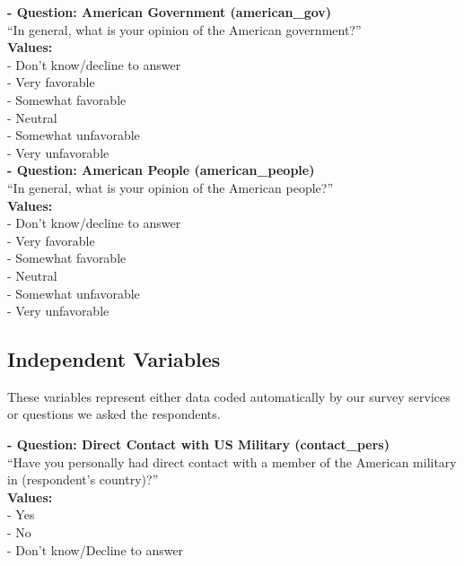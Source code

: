 \documentclass[12pt]{article}
\begin{document}
\noindent\textbf{  - Question: American Government (american\_gov)} \\
``In general, what is your opinion of the American government?''\\
\textbf{Values:}\\
 - Don’t know/decline to answer\\
 - Very favorable \\
 - Somewhat favorable\\
 - Neutral\\
 - Somewhat unfavorable\\
 - Very unfavorable\\


\noindent\textbf{  - Question: American People (american\_people)} \\
``In general, what is your opinion of the American people?''\\
\textbf{Values:}\\
 - Don’t know/decline to answer\\
 - Very favorable \\
 - Somewhat favorable\\
 - Neutral\\
 - Somewhat unfavorable\\
 - Very unfavorable\\




\subsection{Independent Variables}

These variables represent either data coded automatically by our survey services or questions we asked the respondents. 


\noindent\textbf{  - Question: Direct Contact with US Military  (contact\_pers)} \\
``Have you personally had direct contact with a member of the American military in (respondent's country)?''\\
\textbf{Values:}\\
 - Yes\\
 - No\\
 - Don’t know/Decline to answer\\
\end{document}
